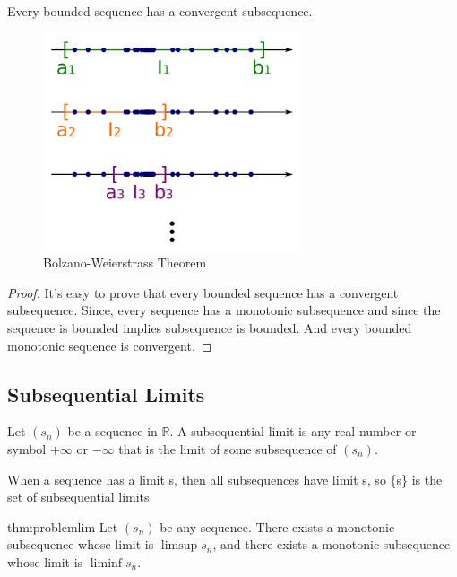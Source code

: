 \documentclass{notes}
\begin{document}
\begin{theorem}{}\cite{wikib}
	Every bounded sequence has a convergent subsequence.
	
	
	
\end{theorem}
\begin{figure}[!h]  %
	\begin{center}
		\includegraphics[width=3in]{bolanzo.png}
		\caption{Bolzano-Weierstrass Theorem}
	\end{center}
\end{figure}
\begin{proof}
	It's easy to prove that every bounded sequence has a convergent subsequence. Since, every sequence has a monotonic subsequence and since  the sequence is bounded implies subsequence is bounded. And every bounded monotonic sequence is convergent.
\end{proof}
\subsection{Subsequential Limits}
\begin{definition}{}
	Let $(s_n)$ be a sequence in $\mathbb{R}$. A subsequential limit is any real number
	or symbol $+\infty$ or $-\infty$ that is the limit of some subsequence of $(s_n)$.
	
	When a sequence has a limit s, then all subsequences have limit
	s, so \{s\} is the set of subsequential limits
\end{definition}


\begin{theorem}{thm:problemlim}
	Let $(s_n)$ be any sequence. There exists a monotonic subsequence
	whose limit is $\limsup s_n$, and there exists a monotonic subsequence
	whose limit is $\liminf s_n$.
\end{theorem}
\end{document}
